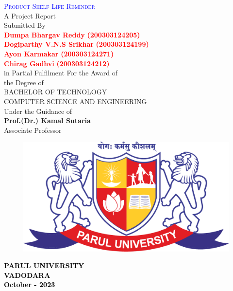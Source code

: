 \thispagestyle{empty}
\begin{center}
\textcolor{blue}{{\huge \textsc{Product Shelf Life Reminder} }}\\
\vspace{1cm}
A Project Report \\
\vspace{0.3cm}
Submitted By\\

\textcolor{red}{{\huge \bf Dumpa Bhargav Reddy} {\bf (200303124205)}}\\ 
\textcolor{red}{{\huge \bf Dogiparthy V.N.S Srikhar} {\bf (200303124199)}}\\ 
\textcolor{red}{{\huge \bf Ayon Karmakar} {\bf (200303124271)}}\\ 
\textcolor{red}{{\huge \bf Chirag Gadhvi} {\bf (200303124212)}}\\ 

\vspace{0.4cm}
in Partial Fulfilment For the Award of\\
the Degree of\\
BACHELOR OF TECHNOLOGY\\
COMPUTER SCIENCE AND ENGINEERING\\
Under the Guidance of\\
\large{\textbf{Prof.(Dr.) Kamal Sutaria}}\\
Associate Professor\\

\vspace{0.3cm}
\begin{figure}[h]
\begin{center}
     \includegraphics[scale=0.1]{parullogo.png}
\end{center}
\end{figure}
\textcolor{black}{\textbf{\large{PARUL UNIVERSITY}\\
VADODARA\\
October - 2023}}
\end{center}
